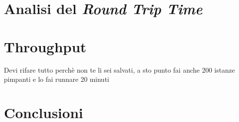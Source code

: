 \vspace{35px}\section{Analisi del \textsl{Round Trip Time}}



\vspace{35px}\section{Throughput}

Devi rifare tutto perchè non te li sei salvati, a sto punto fai anche 200 istanze pimpanti e lo fai runnare 20 minuti

\vspace{35px}\section{Conclusioni}




